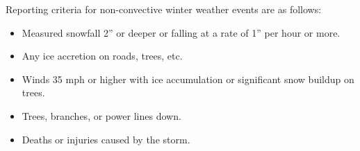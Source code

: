 \documentclass[pdflatex,letterpaper,twoside,12pt]{book}
\begin{document}
Reporting criteria for non-convective winter weather events are as follows:
\begin{itemize}
\item Measured snowfall 2'' or deeper or falling at a rate of 1'' per hour or more.
\item Any ice accretion on roads, trees, etc.
\item Winds 35 mph or higher with ice accumulation or significant snow buildup on trees.
\item Trees, branches, or power lines down.
\item Deaths or injuries caused by the storm.
\end{itemize}
\end{document}
